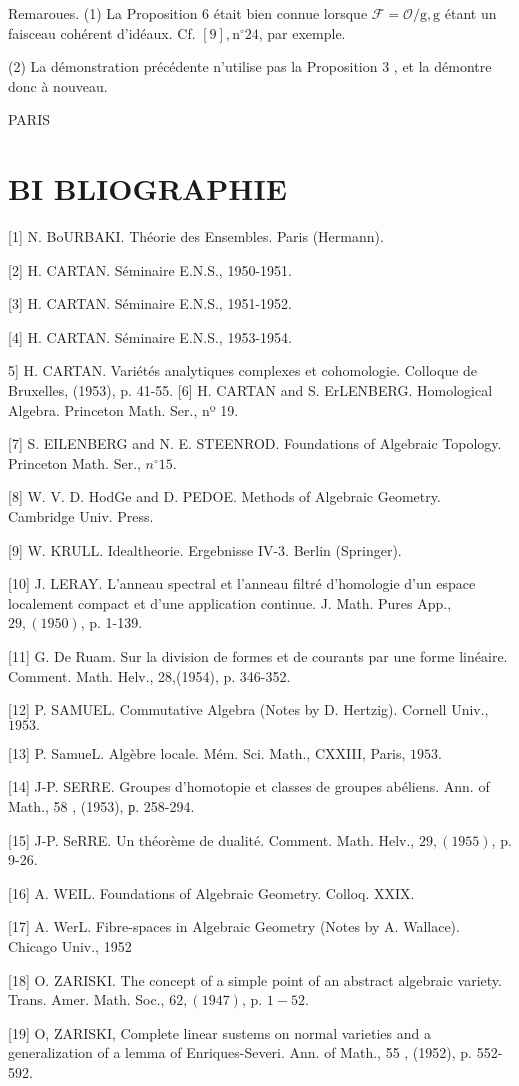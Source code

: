 Remaroues. (1) La Proposition 6 était bien connue lorsque $\mathcal{F}=\mathcal{O} / \mathrm{g}, \mathrm{g}$ étant un faisceau cohérent d'idéaux. Cf. $[9], \mathrm{n}^{\circ} 24$, par exemple.

(2) La démonstration précédente n'utilise pas la Proposition 3 , et la démontre donc à nouveau.

PARIS

\section{BI BLIOGRAPHIE}

[1] N. BoURBAKI. Théorie des Ensembles. Paris (Hermann).

[2] H. CARTAN. Séminaire E.N.S., 1950-1951.

[3] H. CARTAN. Séminaire E.N.S., 1951-1952.

[4] H. CARTAN. Séminaire E.N.S., 1953-1954.

5] H. CARTAN. Variétés analytiques complexes et cohomologie. Colloque de Bruxelles, (1953), p. 41-55. [6] H. CARTAN and S. ErLENBERG. Homological Algebra. Princeton Math. Ser., nº 19.

[7] S. EILENBERG and N. E. STEENROD. Foundations of Algebraic Topology. Princeton Math. Ser., $n^{\circ} 15 .$

[8] W. V. D. HodGe and D. PEDOE. Methods of Algebraic Geometry. Cambridge Univ. Press.

[9] W. KRULL. Idealtheorie. Ergebnisse IV-3. Berlin (Springer).

[10] J. LERAY. L'anneau spectral et l'anneau filtré d'homologie d'un espace localement compact et d'une application continue. J. Math. Pures App., $29,(1950)$, p. 1-139.

[11] G. De Ruam. Sur la division de formes et de courants par une forme linéaire. Comment. Math. Helv., 28,(1954), p. 346-352.

[12] P. SAMUEL. Commutative Algebra (Notes by D. Hertzig). Cornell Univ., $1953 .$

[13] P. SamueL. Algèbre locale. Mém. Sci. Math., CXXIII, Paris, $1953 .$

[14] J-P. SERRE. Groupes d'homotopie et classes de groupes abéliens. Ann. of Math., 58 , (1953), р. 258-294.

[15] J-P. SeRRE. Un théorème de dualité. Comment. Math. Helv., $29,(1955)$, p. 9-26.

[16] A. WEIL. Foundations of Algebraic Geometry. Colloq. XXIX.

[17] A. WerL. Fibre-spaces in Algebraic Geometry (Notes by A. Wallace). Chicago Univ., 1952

[18] O. ZARISKI. The concept of a simple point of an abstract algebraic variety. Trans. Amer. Math. Soc., $62,(1947)$, p. $1-52 .$

[19] O, ZARISKI, Complete linear sustems on normal varieties and a generalization of a lemma of Enriques-Severi. Ann. of Math., 55 , (1952), p. 552-592.